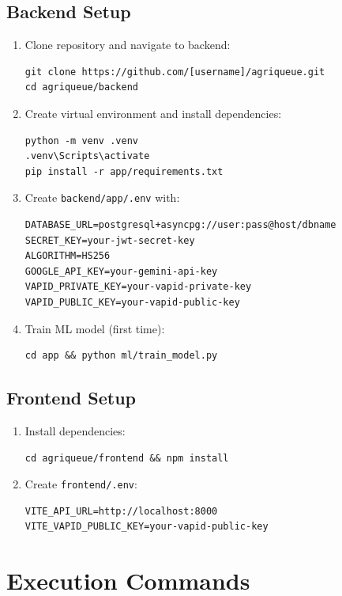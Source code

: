 \subsection{Backend Setup}
\begin{enumerate}
  \item Clone repository and navigate to backend:
\begin{lstlisting}
git clone https://github.com/[username]/agriqueue.git
cd agriqueue/backend
\end{lstlisting}
  \item Create virtual environment and install dependencies:
\begin{lstlisting}
python -m venv .venv
.venv\Scripts\activate
pip install -r app/requirements.txt
\end{lstlisting}
  \item Create \texttt{backend/app/.env} with:
\begin{lstlisting}
DATABASE_URL=postgresql+asyncpg://user:pass@host/dbname
SECRET_KEY=your-jwt-secret-key
ALGORITHM=HS256
GOOGLE_API_KEY=your-gemini-api-key
VAPID_PRIVATE_KEY=your-vapid-private-key
VAPID_PUBLIC_KEY=your-vapid-public-key
\end{lstlisting}
  \item Train ML model (first time):
\begin{lstlisting}
cd app && python ml/train_model.py
\end{lstlisting}
\end{enumerate}

\subsection{Frontend Setup}
\begin{enumerate}
  \item Install dependencies:
\begin{lstlisting}
cd agriqueue/frontend && npm install
\end{lstlisting}
  \item Create \texttt{frontend/.env}:
\begin{lstlisting}
VITE_API_URL=http://localhost:8000
VITE_VAPID_PUBLIC_KEY=your-vapid-public-key
\end{lstlisting}
\end{enumerate}

\section{Execution Commands}

